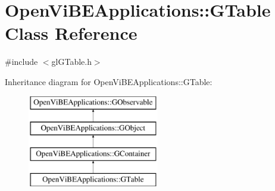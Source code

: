 \hypertarget{classOpenViBEApplications_1_1GTable}{
\section{OpenViBEApplications::GTable Class Reference}
\label{classOpenViBEApplications_1_1GTable}
}


{\ttfamily \#include $<$glGTable.h$>$}

Inheritance diagram for OpenViBEApplications::GTable:\begin{figure}[H]
\begin{center}
\leavevmode
\includegraphics[height=4.000000cm]{classOpenViBEApplications_1_1GTable}
\end{center}
\end{figure}
